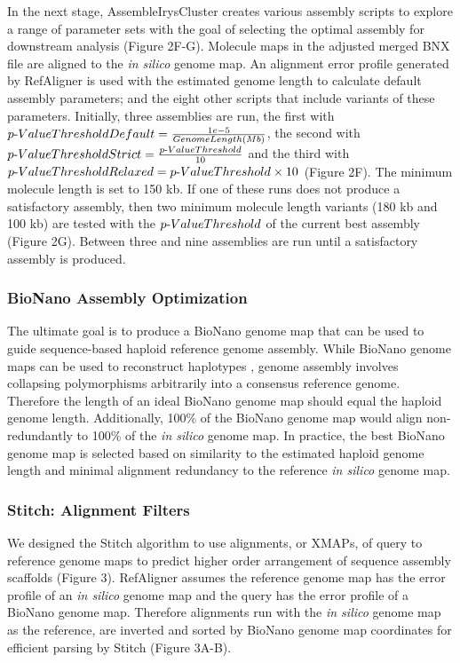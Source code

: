 \documentclass{bmcart}
\begin{document}
In the next stage, AssembleIrysCluster creates various assembly scripts to explore a range of parameter sets with the goal of selecting the optimal assembly for downstream analysis (Figure 2F-G). Molecule maps in the adjusted merged BNX file are aligned to the \textit{in silico} genome map. An alignment error profile generated by RefAligner is used with the estimated genome length to calculate default assembly parameters; and the eight other scripts that include variants of these parameters. Initially, three assemblies are run, the first with $p\textnormal{-}Value Threshold Default = \frac{1e-5}{Genome Length (Mb)}$, the second with  $p\textnormal{-}Value Threshold Strict = \frac{p\textnormal{-}Value Threshold}{10}$ and the third with $p\textnormal{-}Value Threshold Relaxed = {p\textnormal{-}Value Threshold} \times {10}$ (Figure 2F). The minimum molecule length is set to 150 kb. If one of these runs does not produce a satisfactory assembly, then two minimum molecule length variants (180 kb and 100 kb) are tested with the $p\textnormal{-}Value Threshold$ of the current best assembly (Figure 2G). Between three and nine assemblies are run until a satisfactory assembly is produced.

\subsubsection*{BioNano Assembly Optimization}

The ultimate goal is to produce a BioNano genome map that can be used to guide sequence-based haploid reference genome assembly. While BioNano genome maps can be used to reconstruct haplotypes \cite{MHCLam}, genome assembly involves collapsing polymorphisms arbitrarily into a consensus reference genome. Therefore the length of an ideal BioNano genome map should equal the haploid genome length. Additionally, 100\% of the BioNano genome map would align non-redundantly to 100\% of the \textit{in silico} genome map. In practice, the best BioNano genome map is selected based on similarity to the estimated haploid genome length and minimal alignment redundancy to the reference \textit{in silico} genome map.

\subsubsection*{Stitch: Alignment Filters}

We designed the Stitch algorithm to use alignments, or XMAPs, of query to reference genome maps to predict higher order arrangement of sequence assembly scaffolds  (Figure 3). RefAligner assumes the reference genome map has the error profile of an \textit{in silico} genome map and the query has the error profile of a BioNano genome map. Therefore alignments run with the \textit{in silico} genome map as the reference, are inverted and sorted by BioNano genome map coordinates for efficient parsing by Stitch (Figure 3A-B). 
\end{document}
